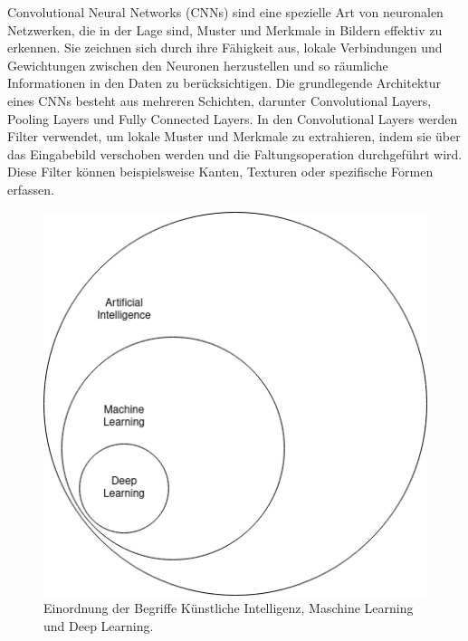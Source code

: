     Convolutional Neural Networks (CNNs) sind eine spezielle Art von neuronalen Netzwerken, die in der Lage sind, Muster und Merkmale in Bildern effektiv zu erkennen. 
    Sie zeichnen sich durch ihre Fähigkeit aus, lokale Verbindungen und Gewichtungen zwischen den Neuronen herzustellen und so räumliche Informationen in den Daten zu berücksichtigen.
    Die grundlegende Architektur eines CNNs besteht aus mehreren Schichten, darunter Convolutional Layers, Pooling Layers und Fully Connected Layers. 
    In den Convolutional Layers werden Filter verwendet, um lokale Muster und Merkmale zu extrahieren, indem sie über das Eingabebild verschoben werden und die Faltungsoperation durchgeführt wird. 
    Diese Filter können beispielsweise Kanten, Texturen oder spezifische Formen erfassen.
    \begin{figure}
        \begin{center}
               \includegraphics[width=1.06\textwidth]{img/KI-ML-DL.png}
        \end{center}
        \caption{Einordnung der Begriffe Künstliche Intelligenz, Maschine Learning und Deep Learning.}
        \label{fig:KI-ML-DL}
    \end{figure}

